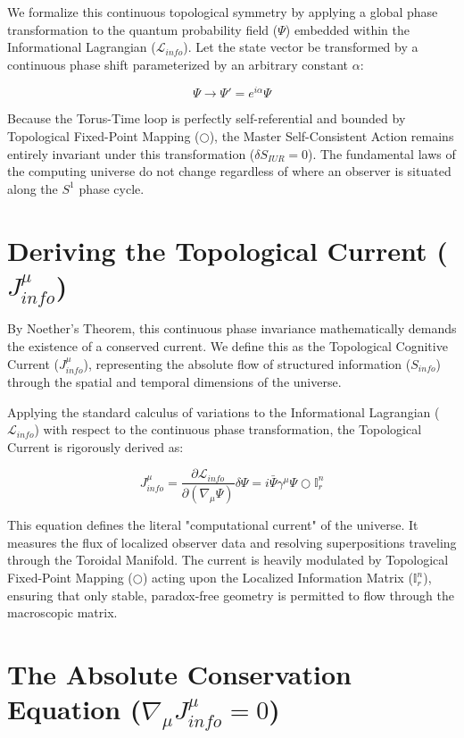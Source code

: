 \documentclass[12pt,openany]{book}
\theoremstyle{plain}
\theoremstyle{definition}
\theoremstyle{remark}
\begin{document}
We formalize this continuous topological symmetry by applying a global phase transformation to the quantum probability field ($\Psi$) embedded within the Informational Lagrangian ($\mathcal{L}_{info}$). Let the state vector be transformed by a continuous phase shift parameterized by an arbitrary constant $\alpha$:

\begin{equation}
\Psi \to \Psi' = e^{i\alpha}\Psi
\end{equation}

Because the Torus-Time loop is perfectly self-referential and bounded by Topological Fixed-Point Mapping ($\bigcirc$), the Master Self-Consistent Action remains entirely invariant under this transformation ($\delta S_{IUR} = 0$). The fundamental laws of the computing universe do not change regardless of where an observer is situated along the $S^1$ phase cycle.

\section{Deriving the Topological Current ($J_{info}^\mu$)}

By Noether's Theorem, this continuous phase invariance mathematically demands the existence of a conserved current. We define this as the Topological Cognitive Current ($J_{info}^\mu$), representing the absolute flow of structured information ($S_{info}$) through the spatial and temporal dimensions of the universe.

Applying the standard calculus of variations to the Informational Lagrangian ($\mathcal{L}_{info}$) with respect to the continuous phase transformation, the Topological Current is rigorously derived as:

\begin{equation}
J_{info}^\mu = \frac{\partial \mathcal{L}_{info}}{\partial (\nabla_\mu \Psi)} \delta \Psi = i\bar{\Psi}\gamma^\mu\Psi \bigcirc \mathbb{I}_r^n
\end{equation}

This equation defines the literal "computational current" of the universe. It measures the flux of localized observer data and resolving superpositions traveling through the Toroidal Manifold. The current is heavily modulated by Topological Fixed-Point Mapping ($\bigcirc$) acting upon the Localized Information Matrix ($\mathbb{I}_r^n$), ensuring that only stable, paradox-free geometry is permitted to flow through the macroscopic matrix.

\section{The Absolute Conservation Equation ($\nabla_\mu J_{info}^\mu = 0$)}
\end{document}
